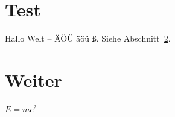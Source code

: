\documentclass{article}
\begin{document}
\section{Test}
Hallo Welt – ÄÖÜ äöü ß. Siehe Abschnitt~\ref{sec:x}.
\section{Weiter}\label{sec:x}
$E = mc^2$
\end{document}
